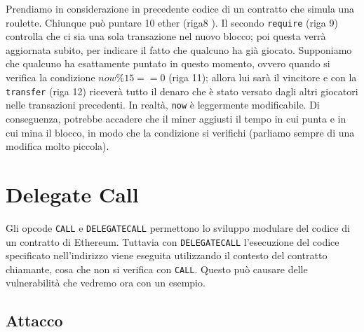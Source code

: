 Prendiamo in considerazione in precedente codice di un contratto che simula
una roulette.
Chiunque può puntare 10 ether (riga8 ).
Il secondo \verb|require| (riga 9) controlla che ci sia una
sola transazione nel nuovo blocco;
poi questa verrà aggiornata subito,
per indicare il fatto che qualcuno ha già giocato.
Supponiamo che qualcuno ha
esattamente puntato in questo
momento, ovvero quando si
verifica la condizione $now \%15 ==  0$ (riga 11); allora lui sarà
il vincitore e con la \verb|transfer| (riga 12)
riceverà tutto il denaro che è stato versato dagli altri giocatori nelle
transazioni precedenti.
In realtà, \verb|now| è leggermente modificabile.
Di conseguenza, potrebbe accadere che il
miner aggiusti il tempo in cui punta e in cui mina il blocco,
in modo che la condizione si
verifichi (parliamo sempre di una modifica molto piccola).

\section{Delegate Call}

Gli opcode \verb|CALL| e \verb|DELEGATECALL| permettono lo sviluppo modulare
del codice di un contratto di Ethereum.
Tuttavia con \verb|DELEGATECALL| l'esecuzione del codice specificato
nell'indirizzo viene eseguita utilizzando il contesto del contratto chiamante,
cosa che non si verifica con \verb|CALL|.
Questo può causare delle vulnerabilità che vedremo ora con un esempio.

\subsection{Attacco}

